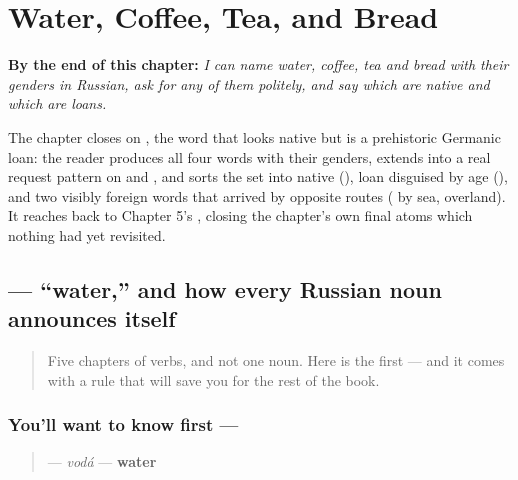 
\chapter{Water, Coffee, Tea, and Bread}
\label{ch:russian-water-coffee-tea-bread}

\begin{chapteropening}
\textbf{By the end of this chapter:} \emph{I can name water, coffee, tea and bread with their genders in Russian, ask for any of them politely, and say which are native and which are loans.}

The chapter closes on , the word that looks native but is a prehistoric Germanic loan: the reader produces all four words with their genders, extends  into a real request pattern on  and , and sorts the set into native (), loan disguised by age (), and two visibly foreign words that arrived by opposite routes ( by sea,  overland). It reaches back to Chapter 5's , closing the chapter's own final atoms which nothing had yet revisited.
\end{chapteropening}

\section[\texorpdfstring{\ru{вода} (vodá)}{вода (vodá)}]{ — \textquotedblleft{}water,\textquotedblright{} and how every Russian noun announces itself}

\label{lesson:RU-C06-voda}



\begin{quote}
Five chapters of verbs, and not one noun. Here is the first — and it comes with a rule that will save you for the rest of the book.
\end{quote}

\subsection*{You'll want to know first — }
\begin{quote}
\textbf{} — \emph{vodá} — \textbf{water}
\end{quote}

